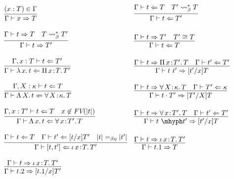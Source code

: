 \documentclass{article}
\newcommand{\abs}[4]{{#1}\, #2\! : \! #3.\, #4}
\newcommand{\absu}[3]{{#1}\, #2.\, #3}
\newcommand{\tpcheck}[0]{\Leftarrow}
\newcommand{\tpsynth}[0]{\Rightarrow}
\begin{document}
\begin{figure}
  \[
  \begin{array}{ll}
    \infer{\Gamma\vdash x\tpsynth T}{(x : T)\in\Gamma} &
    \infer{\Gamma\vdash t\tpcheck T'}{\Gamma\vdash t \tpcheck T & T' \leadsto^*_\beta T} \\ \\    
    \infer{\Gamma\vdash t\tpsynth T'}{\Gamma\vdash t \tpsynth T & T \leadsto^*_\beta T'} &
    \infer{\Gamma\vdash t\tpcheck T}{\Gamma\vdash t\tpsynth T' & T' \cong T} \\ \\    
    \infer{\Gamma\vdash \absu{\lambda}{x}{t} \tpcheck \abs{\Pi}{x}{T}{T'}}{\Gamma,x:T\vdash t\tpcheck T'} &
    \infer{\Gamma\vdash t\ t' \tpsynth [t'/x]T}{\Gamma\vdash t \tpsynth \abs{\Pi}{x}{T'}{T} & \Gamma\vdash t' \tpcheck T'} \\ \\

    \infer{\Gamma\vdash \absu{\Lambda}{X}{t} \tpcheck \abs{\forall}{X}{\kappa}{T}}{\Gamma,X:\kappa\vdash t \tpcheck T} &
    \infer{\Gamma\vdash t \cdot T' \tpsynth [T'/X]T}
          {\Gamma\vdash t \tpsynth \abs{\forall}{X}{\kappa}{T} & \Gamma\vdash T' \tpcheck\kappa} \\ \\

    \infer{\Gamma\vdash \absu{\Lambda}{x}{t} \tpcheck \abs{\forall}{x}{T'}{T}}{\Gamma,x:T'\vdash t \tpcheck T & x\not\in\textit{FV}(|t|)} &
    \infer{\Gamma\vdash t\ \mhyph t' \tpsynth [t'/x]T}{\Gamma\vdash t \tpsynth \abs{\forall}{x}{T'}{T} & \Gamma\vdash t' \tpcheck T'} \\ \\

    \infer{\Gamma\vdash [ t , t' ] \tpcheck \abs{\iota}{x}{T}{T'}}
          {\Gamma\vdash t \tpcheck T & \Gamma\vdash t' \tpcheck [t/x]T' & |t| =_{\beta\eta} |t'|} &
    \infer{\Gamma\vdash t.1 \tpsynth T}{\Gamma\vdash t \tpsynth \abs{\iota}{x}{T}{T'}} \\ \\
    \infer{\Gamma\vdash t.2 \tpsynth [t.1/x]T'}{\Gamma\vdash t \tpsynth \abs{\iota}{x}{T}{T'}} &


\end{array}\]
\end{figure}
\end{document}
